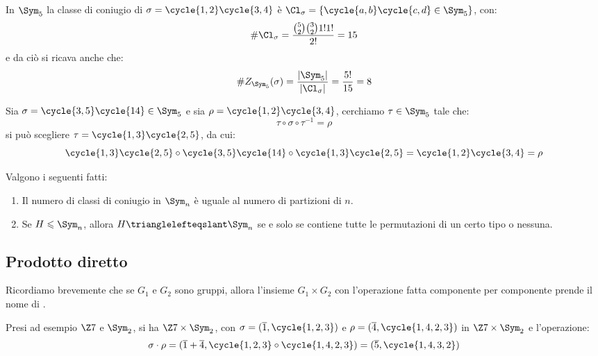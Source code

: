 \documentclass[11pt]{scrartcl}
\begin{document}
\begin{example}
    In $\Sym_{5}$ la classe di coniugio di $\sigma = \cycle{1,2}\cycle{3,4}$ è $\Cl_\sigma = \{\cycle{a,b}\cycle{c,d} \in \Sym_{5}\}$, con:
        \[ \#\Cl_\sigma = \frac{\binom{5}{2}\binom{3}{2}1!1!}{2!} = 15
            \]
    e da ciò si ricava anche che:
        \[ \#Z_{\Sym_{5}}(\sigma) = \frac{|\Sym_{5}|}{|\Cl_\sigma|} = \frac{5!}{15} = 8
            \]
\end{example}

\begin{example}
    Sia $\sigma = \cycle{3,5}\cycle{14} \in \Sym_{5}$ e sia $\rho = \cycle{1,2}\cycle{3,4}$, cerchiamo $\tau \in \Sym_{5}$ tale che:
        \[ \tau\circ\sigma\circ\tau^{-1} = \rho
            \]
    si può scegliere $\tau = \cycle{1,3}\cycle{2,5}$, da cui:
        \[ \cycle{1,3}\cycle{2,5} \circ \cycle{3,5}\cycle{14} \circ \cycle{1,3}\cycle{2,5} = \cycle{1,2}\cycle{3,4} = \rho
            \]
\end{example}

\begin{corollary}
    \label{c:1.68}
    Valgono i seguenti fatti:
        \begin{enumerate}[(1)]
            \item Il numero di classi di coniugio in $\Sym_n$ è uguale al numero di partizioni di $n$.
            \item Se $H \leqslant \Sym_n$, allora $H \trianglelefteqslant \Sym_n$ se e solo se contiene tutte le permutazioni di un certo tipo o nessuna.
        \end{enumerate}
\end{corollary}

\pagebreak

\subsection{Prodotto diretto}
Ricordiamo brevemente che se $G_1$ e $G_2$ sono gruppi, allora l'insieme $G_1 \times G_2$ con l'operazione fatta componente per componente prende il nome di .

\begin{example}
    Presi ad esempio $\Z7$ e $\Sym_2$, si ha $\Z7 \times \Sym_2$, con $\sigma = (\overline 1, \cycle{1,2,3})$ e $\rho = (\overline 4, \cycle{1,4,2,3})$ in $\Z7 \times \Sym_2$ e l'operazione:
        \[ \sigma \cdot \rho = (\overline 1 + \overline 4, \cycle{1,2,3} \circ \cycle{1,4,2,3}) = (\overline 5, \cycle{1,4,3,2})
            \]
\end{example}
\end{document}
